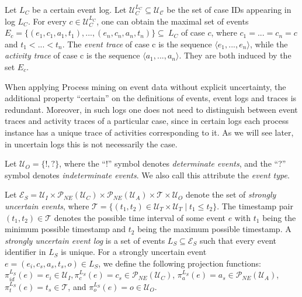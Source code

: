 \begin{definition}\label{def: certain traces}
Let $L_C$ be a certain event log. 
Let $\mathcal{U}_C^{L_C} \subseteq \mathcal{U_C}$ be the set of case IDs appearing in log $L_C$. 
For every $c \in \mathcal{U}_C^{L_C}$, one can obtain the maximal set of events $E_c = \{(e_1,c_1,a_1,t_1), ..., (e_n,c_n,a_n,t_n)\} \subseteq \ L_C$ of case $c$, where $c_1=...=c_n=c$ and $t_1<...<t_n$.
The \emph{event trace} of case c is the sequence $\langle e_1,...,e_n \rangle$, while the \emph{activity trace} of case c is the sequence $\langle a_1,...,a_n \rangle$.
They are both induced by the set $E_c$.
\end{definition}



When applying Process mining on event data without explicit uncertainty, the additional property ``certain'' on the definitions of events, event logs and traces is redundant.
Moreover, in such logs one does not need to distinguish between event traces and activity traces of a particular case, since in certain logs each process instance has a unique trace of activities corresponding to it.
As we will see later, in uncertain logs this is not necessarily the case.


\begin{definition}
Let $\mathcal{U}_O = \{!, ?\}$, where the ``!'' symbol denotes \emph{determinate events}, and the ``?'' symbol denotes \emph{indeterminate events}.
We also call this attribute the \emph{event type}.
\end{definition}




\begin{definition}
Let $\mathcal{E}_S=\mathcal{U}_I \times \mathcal{P}_{NE}(\mathcal{U}_C) \times \mathcal{P}_{NE}(\mathcal{U}_A) \times \mathcal{T} \times \mathcal{U}_O$ denote the set of \emph{strongly uncertain events}, where $\mathcal{T} = \{(t_1,t_2) \in \mathcal{U}_T \times \mathcal{U}_T \mid t_1 \leq t_2\}$.
The timestamp pair $(t_1,t_2) \in \mathcal{T}$ denotes the possible time interval of some event $e$ with $t_1$ being the minimum possible timestamp and $t_2$ being the maximum possible timestamp.
A \emph{strongly uncertain event log} is a set of events $L_S \subseteq \mathcal{E}_S$ such that every event identifier in $L_S$ is unique.
For a strongly uncertain event $e=(e_i,c_s,a_s,t_s,o) \in L_S$, we define the following projection functions: 
$\pi_{id}^{L_S}(e)=e_i \in \mathcal{U}_I, 
\pi_c^{L_S}(e)=c_s \in \mathcal{P}_{NE}(\mathcal{U}_C)$, 
$\pi_a^{L_S}(e)=a_s \in \mathcal{P}_{NE}(\mathcal{U}_A)$, 
$\pi_t^{L_S}(e)=t_s \in \mathcal{T}$, and 
$\pi^{L_S}_o(e)=o \in \mathcal{U}_O$. 
\end{definition}

